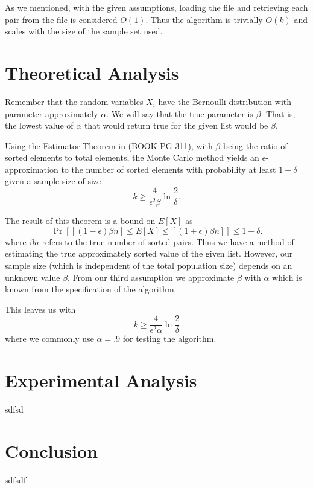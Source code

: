 \documentclass[11pt]{article}
\begin{document}
As we mentioned, with the given assumptions, loading the file and retrieving each pair from the file is considered $O(1)$. Thus the algorithm is trivially $O(k)$ and scales with the size of the sample set used. 

\section{Theoretical Analysis}

Remember that the random variables $X_i$ have the Bernoulli distribution with parameter approximately $\alpha$. We will say that the true parameter is $\beta$. That is, the lowest value of $\alpha$ that would return true for the given list would be $\beta$. 

Using the Estimator Theorem in (BOOK PG 311), with $\beta$ being the ratio of sorted elements to total elements, the Monte Carlo method yields an $\epsilon$-approximation to the number of sorted elements with probability at least $1-\delta$ given a sample size of size $$k \geq \frac{4}{\epsilon^2 \beta} \ln \frac{2}{\delta}.$$ 

The result of this theorem is a bound on $E[X]$ as $$\Pr\left[ [(1-\epsilon)\beta n] \leq E[X] \leq [(1+\epsilon)\beta n] \right] \leq 1 - \delta.$$ where $\beta n$ refers to the true number of sorted pairs. Thus we have a method of estimating the true approximately sorted value of the given list. However, our sample size (which is independent of the total population size) depends on an unknown value $\beta$. From our third assumption we approximate $\beta$ with $\alpha$ which is known from the specification of the algorithm. 

This leaves us with $$k \geq \frac{4}{\epsilon^2 \alpha} \ln \frac{2}{\delta}$$ where we commonly use $\alpha = .9$ for testing the algorithm. 

\section{Experimental Analysis}

sdfsd

\section{Conclusion}

sdfsdf

\vspace{.15in}
\end{document}

